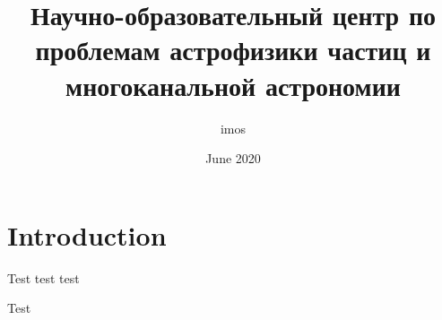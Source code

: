 \documentclass[a4paper,11pt]{article}
\title{\Russian Научно-образовательный центр по проблемам астрофизики частиц и многоканальной астрономии}
\author{imos }
\date{June 2020}
\renewcommand{\cite}[1]{\citep{#1}}
\begin{document}
\maketitle
\tableofcontents

\section{Introduction}

Test test test 

Test
\cite{2019AdSpR..64.2531T}
\cite{2019PhRvL.122r1102A}
\cite{2019PhRvL.122j1101A}
\cite{2019PhRvL.122d1102A}
\cite{2018ApJ...865...74A}
\cite{2018PhRvL.121e1103A}
\cite{2018Sci...361.1378I}
\cite{2018PhRvL.120z1102A}
\cite{2018PhRvL.120b1101A}
\cite{2017PhRvL.119y1101A}
\cite{2017Sci...358..911A}
\cite{2017ApJ...848L..13A}
\cite{2017ApJ...848L..12A}
\cite{2017NCimR..40..473P}
\cite{2017ApJ...843...40A}
\cite{2017PhRvD..95h2007A}
\cite{2016PhRvL.117w1102A}
\cite{2016PhRvL.117i1103A}
\cite{2016ApJ...826L..13A}
\cite{2016ApJ...823L...2A}
\cite{2016ApJS..224....8A}
\cite{2016ApJS..222....5A}
\cite{2015PhRvL.115u1101A}
\cite{2015NIMPA.798..172P}
\cite{2015PhRvL.115l1802A}
\cite{2015ApJ...810...14A}
\cite{2015ApJS..218...23A}
\cite{2015PhRvL.114q1103A}
\cite{2015APh....64...49A}
\cite{2015ApJ...799...86A}
\cite{2014PhRvD..90l2006A}
\cite{2014PhRvL.113v1102A}
\cite{2014PhRvL.113l1101A}
\cite{2014PhRvL.113l1102A}
\cite{2014ApJ...793...64A}
\cite{2014ApJ...791...93A}
\cite{2014PhRvL.112o1103A}
\cite{2013APh....50...26A}
\cite{2013ApJS..209...34A}
\cite{2013ApJS..209...11A}
\cite{2013ApJS..208...17A}
\cite{2013PhRvD..88d2004A}
\cite{2013ApJ...768L...1A}
\cite{2013APh....44...40A}
\cite{2013PhRvL.110n1102A}
\cite{2013ApJ...765...54A}
\cite{2013APh....43....3A}
\cite{2013Sci...339..807A}
\cite{2013JETPL..96..621A}
\cite{2012ApJS..203...34P}
\cite{2012ApJS..203....4A}
\cite{2012JInst...7P0011A}
\cite{2012NIMPA.689...87A}
\cite{2012ApJ...753...83A}
\cite{2012ApJ...750....3A}
\cite{2012PhRvL.108e1102A}
\cite{2012PhRvL.108a1103A}
\cite{2011Sci...332...69A}
\cite{2011APh....34..627P}
\cite{2011Sci...331..739A}
\cite{2010PhRvD..82i2004A}
\cite{2010ApJS..188..405A}
\cite{2010PhRvL.104j1101A}
\cite{2010ApJ...710..133A}
\cite{2009PhRvL.103y1101A}
\cite{2009APh....32..193A}
\cite{2009ApJ...703.1249A}
\cite{2009JInst...4.6020A}
\cite{2009PhRvL.102r1101A}
\cite{2009Natur.458..607A}
\cite{2009ApJ...692L.130A}
\cite{2009PhRvL.102e1101A}
\cite{2008PhRvL.100j1101A}
\cite{2005ApJ...622..910A}
\cite{1989NIMPA.277...23A}
\cite{1995astro.ph..9091T}
\cite{2017Natur.552...63D}
\cite{2012ApJ...752...22B}
\end{document}
